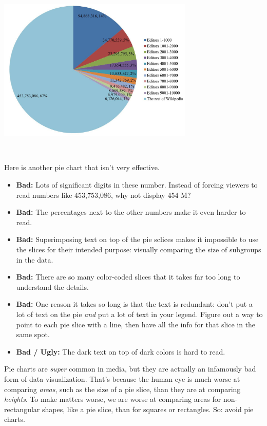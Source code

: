 \documentclass[]{book}
\providecommand{\tightlist}{%
  \setlength{\itemsep}{0pt}\setlength{\parskip}{0pt}}
\begin{document}
~\\

\includegraphics[width=0.7\textwidth,height=\textheight]{img/vis3.jpg}

~

Here is another pie chart that isn't very effective.

\begin{itemize}
\tightlist
\item
  \textbf{Bad:} Lots of significant digits in these number. Instead of forcing viewers to read numbers like 453,753,086, why not display 454 M?\\
\item
  \textbf{Bad:} The percentages next to the other numbers make it even harder to read.
\item
  \textbf{Bad:} Superimposing text on top of the pie sclices makes it impossible to use the slices for their intended purpose: visually comparing the size of subgroups in the data.
\item
  \textbf{Bad:} There are so many color-coded slices that it takes far too long to understand the details.
\item
  \textbf{Bad:} One reason it takes so long is that the text is redundant: don't put a lot of text on the pie \emph{and} put a lot of text in your legend. Figure out a way to point to each pie slice with a line, then have all the info for that slice in the same spot.\\
\item
  \textbf{Bad / Ugly:} The dark text on top of dark colors is hard to read.
\end{itemize}

Pie charts are \emph{super} common in media, but they are actually an infamously bad form of data visualization. That's because the human eye is much worse at comparing \emph{areas}, such as the size of a pie slice, than they are at comparing \emph{heights}. To make matters worse, we are worse at comparing areas for non-rectangular shapes, like a pie slice, than for squares or rectangles. So: avoid pie charts.
\end{document}
